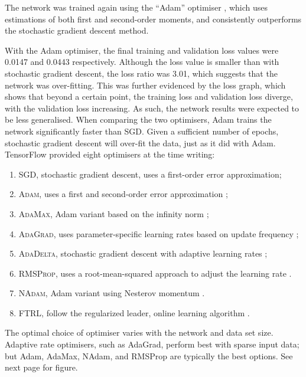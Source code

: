 The network was trained again using the ``Adam'' optimiser
\citep{Kingma:2014:Adam}, which uses estimations of both first and second-order
moments, and consistently outperforms the stochastic gradient descent method.

With the Adam optimiser, the final training and validation loss values were
0.0147 and 0.0443 respectively.
Although the loss value is smaller than with stochastic gradient descent, the
loss ratio was 3.01, which suggests that the network was over-fitting.
This was further evidenced by the loss graph, which shows that beyond a certain
point, the training loss and validation loss diverge, with the validation loss
increasing.
As such, the network results were expected to be less generalised.
When comparing the two optimisers, Adam trains the network significantly faster
than SGD.
Given a sufficient number of epochs, stochastic gradient descent will over-fit
the data, just as it did with Adam.
\newpage\noindent
TensorFlow provided eight optimisers at the time writing:
\begin{enumerate}

    \item\textsc{SGD}, stochastic gradient descent, uses a first-order error
        approximation;

    \item\textsc{Adam}, uses a first and second-order error approximation
        \citep{Kingma:2014:Adam};

    \item\textsc{AdaMax}, Adam variant based on the infinity norm
        \citep{Kingma:2014:Adam};

    \item\textsc{AdaGrad}, uses parameter-specific learning rates based on
        update frequency \citep{Duchi:2011:Adagrad};

    \item\textsc{AdaDelta}, stochastic gradient descent with adaptive learning
        rates \citep{Zeiler:2012:Adadelta};

    \item\textsc{RMSProp}, uses a root-mean-squared approach to adjust the
        learning rate \citep{Hinton:2014:RMSProp}.

    \item\textsc{NAdam}, Adam variant using Nesterov momentum
        \citep{Dozat:2016:NAdam}.

    \item\textsc{FTRL}, follow the regularized leader, online learning
        algorithm \citep{McMahan:2013:FTRL}.

\end{enumerate}
The optimal choice of optimiser varies with the network and data set size.
Adaptive rate optimisers, such as AdaGrad, perform best with sparse input data;
but Adam, AdaMax, NAdam, and RMSProp are typically the best options.
See next page for figure.

